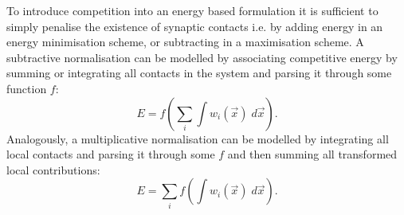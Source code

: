 To introduce competition into an energy based formulation it is sufficient to simply penalise the existence of synaptic contacts i.e. by adding energy in an energy minimisation scheme, or subtracting in a maximisation scheme. A subtractive normalisation can be modelled by associating competitive energy by summing or integrating all contacts in the system and parsing it through some function $f$:
\begin{equation}
E = f\left(\sum_i\int w_i(\vec{x}) \; d\vec{x} \right).
\end{equation}
Analogously, a multiplicative normalisation can be modelled by integrating all local contacts and parsing it through some $f$ and then summing all transformed local contributions:
\begin{equation}
E = \sum_i f\left(\int w_i(\vec{x}) \; d\vec{x}\right).
\end{equation}
